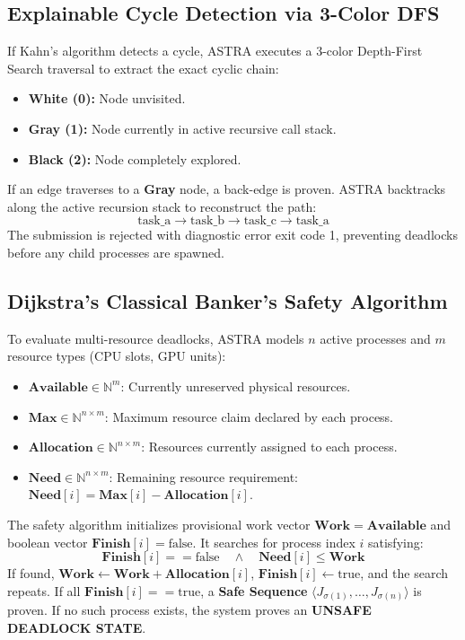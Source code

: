 \documentclass[11pt,a4paper]{article}
\begin{document}
\subsection{Explainable Cycle Detection via 3-Color DFS}
If Kahn's algorithm detects a cycle, ASTRA executes a 3-color Depth-First Search traversal to extract the exact cyclic chain:
\begin{itemize}
    \item \textbf{White (0):} Node unvisited.
    \item \textbf{Gray (1):} Node currently in active recursive call stack.
    \item \textbf{Black (2):} Node completely explored.
\end{itemize}
If an edge traverses to a \textbf{Gray} node, a back-edge is proven. ASTRA backtracks along the active recursion stack to reconstruct the path:
\begin{equation}
    \text{task\_a} \longrightarrow \text{task\_b} \longrightarrow \text{task\_c} \longrightarrow \text{task\_a}
\end{equation}
The submission is rejected with diagnostic error exit code 1, preventing deadlocks before any child processes are spawned.

\subsection{Dijkstra's Classical Banker's Safety Algorithm}
To evaluate multi-resource deadlocks, ASTRA models $n$ active processes and $m$ resource types (CPU slots, GPU units):
\begin{itemize}
    \item $\mathbf{Available} \in \mathbb{N}^m$: Currently unreserved physical resources.
    \item $\mathbf{Max} \in \mathbb{N}^{n \times m}$: Maximum resource claim declared by each process.
    \item $\mathbf{Allocation} \in \mathbb{N}^{n \times m}$: Resources currently assigned to each process.
    \item $\mathbf{Need} \in \mathbb{N}^{n \times m}$: Remaining resource requirement: $\mathbf{Need}[i] = \mathbf{Max}[i] - \mathbf{Allocation}[i]$.
\end{itemize}
The safety algorithm initializes provisional work vector $\mathbf{Work} = \mathbf{Available}$ and boolean vector $\mathbf{Finish}[i] = \text{false}$. It searches for process index $i$ satisfying:
\begin{equation}
    \mathbf{Finish}[i] == \text{false} \quad \land \quad \mathbf{Need}[i] \le \mathbf{Work}
\end{equation}
If found, $\mathbf{Work} \leftarrow \mathbf{Work} + \mathbf{Allocation}[i]$, $\mathbf{Finish}[i] \leftarrow \text{true}$, and the search repeats. If all $\mathbf{Finish}[i] == \text{true}$, a \textbf{Safe Sequence} $\langle J_{\sigma(1)}, \dots, J_{\sigma(n)} \rangle$ is proven. If no such process exists, the system proves an \textbf{UNSAFE DEADLOCK STATE}.
\end{document}
